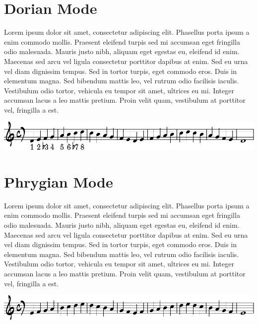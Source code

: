\documentclass[11pt]{article}
\begin{document}
\section*{Dorian Mode}
\label{sec:org1c0cadd}

Lorem ipsum dolor sit amet, consectetur adipiscing elit. Phasellus
porta ipsum a enim commodo mollis. Praesent eleifend turpis sed mi
accumsan eget fringilla odio malesuada. Mauris justo nibh, aliquam
eget egestas eu, eleifend id enim. Maecenas sed arcu vel ligula
consectetur porttitor dapibus at enim. Sed eu urna vel diam dignissim
tempus. Sed in tortor turpis, eget commodo eros. Duis in elementum
magna. Sed bibendum mattis leo, vel rutrum odio facilisis iaculis.
Vestibulum odio tortor, vehicula eu tempor sit amet, ultrices eu mi.
Integer accumsan lacus a leo mattis pretium. Proin velit quam,
vestibulum at porttitor vel, fringilla a est.


\begin{center}
\includegraphics[width=.9\linewidth]{dorian.pdf}
\end{center}



\section*{Phrygian Mode}
\label{sec:org344f124}

Lorem ipsum dolor sit amet, consectetur adipiscing elit. Phasellus
porta ipsum a enim commodo mollis. Praesent eleifend turpis sed mi
accumsan eget fringilla odio malesuada. Mauris justo nibh, aliquam
eget egestas eu, eleifend id enim. Maecenas sed arcu vel ligula
consectetur porttitor dapibus at enim. Sed eu urna vel diam dignissim
tempus. Sed in tortor turpis, eget commodo eros. Duis in elementum
magna. Sed bibendum mattis leo, vel rutrum odio facilisis iaculis.
Vestibulum odio tortor, vehicula eu tempor sit amet, ultrices eu mi.
Integer accumsan lacus a leo mattis pretium. Proin velit quam,
vestibulum at porttitor vel, fringilla a est.

\begin{center}
\includegraphics[width=.9\linewidth]{phrygian.pdf}
\end{center}
\end{document}

